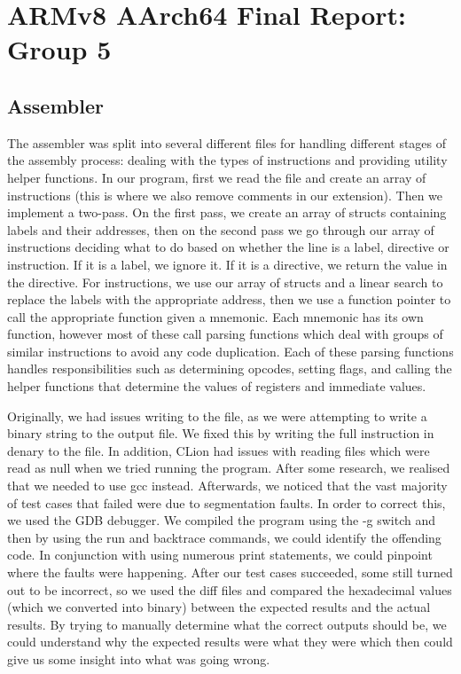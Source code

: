 \documentclass[11pt]{article}
\author{}
\date{}
\begin{document}
\hypertarget{h.cdynd9tc2xhn}{%
\section{\texorpdfstring{{ARMv8 AArch64 Final Report: Group
5}}{ARMv8 AArch64 Final Report: Group 5}}\label{h.cdynd9tc2xhn}}

{}

\hypertarget{h.uu97cprfgtk5}{%
\subsection{\texorpdfstring{{Assembler}}{Assembler}}\label{h.uu97cprfgtk5}}

{}

{The assembler was split into several different files for handling
different stages of the assembly process: dealing with the types of
instructions and providing utility helper functions. In our program,
f}{irst we read the file and create an array of instructions (this is
where we also remove comments in our extension). Then we implement a
two-pass. On the first pass, we create an array of structs containing
labels and their addresses, then on the second pass we go through our
array of instructions deciding what to do based on whether the line is a
label, directive or instruction. If it is a label, we ignore it. If it
is a directive, we return the value in the directive. For instructions,
we use our array of structs and a linear search to replace the labels
with the appropriate address, then we use a function pointer to call the
appropriate function given a mnemonic. Each mnemonic has its own
function, however most of these call parsing functions which deal with
groups of similar instructions to avoid any code duplication. Each of
these parsing functions handles responsibilities such as determining
opcodes, setting flags, and calling the helper functions that determine
the values of registers and immediate values.}

{}

{Originally, we had issues writing to the file, as we were attempting to
write a binary string to the output file. We fixed this by writing the
full instruction in denary to the file. In addition, CLion had issues
with reading files which were read as null when we tried running the
program. After some research, we realised that we needed to use gcc
instead. Afterwards, we noticed that the vast majority of test cases
that failed were due to segmentation faults. In order to correct this,
we used the GDB debugger. We compiled the program using the -g switch
and then by using the run and backtrace commands, we could identify the
offending code. In conjunction with using numerous print statements, we
could pinpoint where the faults were happening. After our test cases
succeeded, some still turned out to be incorrect, so we used the diff
files and compared the hexadecimal values (which we converted into
binary) between the expected results and the actual results. By trying
to manually determine what the correct outputs should be, we could
understand why the expected results were what they were which then could
give us some insight into what was going wrong.}
\end{document}
